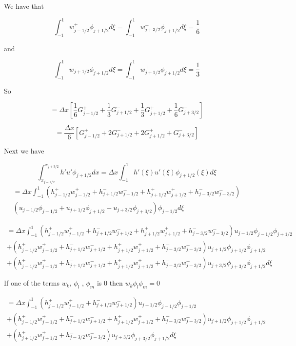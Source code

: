 \documentclass[12pt]{article}
\begin{document}
We have that

\[\int_{-1}^{1} w^+_{j - 1/2}\phi_{j+1/2} d\xi = \int_{-1}^{1} w^-_{j + 3/2}\phi_{j+1/2} d\xi  = \frac{1}{6}\]

and 

\[\int_{-1}^{1} w^-_{j + 1/2}\phi_{j+1/2} d\xi = \int_{-1}^{1} w^+_{j + 1/2}\phi_{j+1/2} d\xi = \frac{1}{3} \]

So

\[= \Delta x \left[\frac{1}{6}G^+_{j- 1/2} +  \frac{1}{3}G^-_{j+ 1/2} +  \frac{1}{3}G^+_{j+ 1/2}  +  \frac{1}{6}G^-_{j+ 3/2}\right]\]

\[= \frac{\Delta x}{6}  \left[G^+_{j- 1/2} +  2G^-_{j+ 1/2} +  2G^+_{j+ 1/2}  +  G^-_{j+ 3/2}\right]\]

Next we have 

\[\int_{x_{j-1/2}}^{x_{j+3/2}} h'u'\phi_{j+1/2} dx = \Delta x \int_{-1}^{1} h'(\xi)u'(\xi)\phi_{j+1/2}(\xi) d\xi\]
\begin{multline}
= \Delta x \int_{-1}^{1} \left(h^+_{j- 1/2}w^+_{j - 1/2} + h^-_{j+ 1/2}w^-_{j + 1/2} + h^+_{j+ 1/2}w^+_{j + 1/2} + h^-_{j- 3/2}w^-_{j - 3/2}\right)\\\left(u_{j- 1/2}\phi_{j - 1/2} + u_{j+1/2}\phi_{j+1/2} +u_{j+ 3/2}\phi_{j+ 3/2} \right)\phi_{j+1/2} d\xi
\end{multline}

\begin{multline}
= \Delta x \int_{-1}^{1} \left(h^+_{j- 1/2}w^+_{j - 1/2} + h^-_{j+ 1/2}w^-_{j + 1/2} + h^+_{j+ 1/2}w^+_{j + 1/2} + h^-_{j- 3/2}w^-_{j - 3/2}\right)u_{j- 1/2}\phi_{j - 1/2}\phi_{j+1/2} \\
+ \left(h^+_{j- 1/2}w^+_{j - 1/2} + h^-_{j+ 1/2}w^-_{j + 1/2} + h^+_{j+ 1/2}w^+_{j + 1/2} + h^-_{j- 3/2}w^-_{j - 3/2}\right)u_{j+1/2}\phi_{j+1/2}\phi_{j+1/2} \\
+\left(h^+_{j- 1/2}w^+_{j - 1/2} + h^-_{j+ 1/2}w^-_{j + 1/2} + h^+_{j+ 1/2}w^+_{j + 1/2} + h^-_{j- 3/2}w^-_{j - 3/2}\right)u_{j+ 3/2}\phi_{j+ 3/2}\phi_{j+1/2} d\xi
\end{multline}

If one of the terms $w_k$, $\phi_l$ , $\phi_m$ is 0 then  $w_k\phi_l\phi_m = 0 $

\begin{multline}
= \Delta x \int_{-1}^{1} \left(h^+_{j- 1/2}w^+_{j - 1/2} + h^-_{j+ 1/2}w^-_{j + 1/2} \right)u_{j- 1/2}\phi_{j - 1/2}\phi_{j+1/2} \\
+ \left(h^+_{j- 1/2}w^+_{j - 1/2} + h^-_{j+ 1/2}w^-_{j + 1/2} + h^+_{j+ 1/2}w^+_{j + 1/2} + h^-_{j- 3/2}w^-_{j - 3/2}\right)u_{j+1/2}\phi_{j+1/2}\phi_{j+1/2} \\
+\left(h^+_{j+ 1/2}w^+_{j + 1/2} + h^-_{j- 3/2}w^-_{j - 3/2}\right)u_{j+ 3/2}\phi_{j+ 3/2}\phi_{j+1/2} d\xi
\end{multline}
\end{document}
